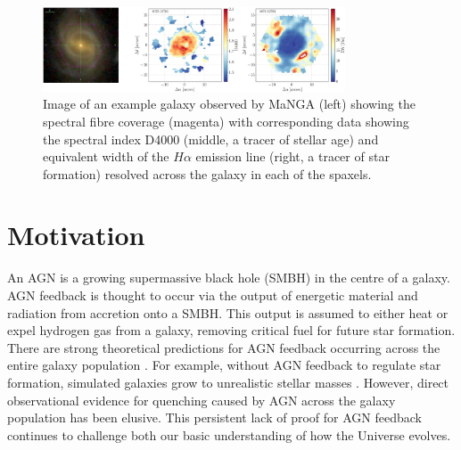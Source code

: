 \documentclass[11pt]{article}
\begin{document}
\begin{figure}[h]
\begin{centering}
\includegraphics[width=0.8\textwidth]{image_halpha_vel_map_8078-12703_gal_aligned_ifu_bundles-MAPS-VOR10-GAU-MILESHC.pdf}
\vspace{-0.5em}
\caption[8pt]{Image of an example galaxy observed by MaNGA (left) showing the spectral fibre coverage (magenta) with corresponding data showing the spectral index D4000 (middle, a tracer of stellar age) and equivalent width of the $H\alpha$ emission line (right, a tracer of star formation) resolved across the galaxy in each of the spaxels.}
\label{gal}
\end{centering}
\vspace{-1.5em}
\end{figure}
\vspace{-0.5em}

\section*{\large Motivation}
\vspace{-0.5em}

\indent An AGN is a growing supermassive black hole (SMBH) in the centre of a galaxy. %
AGN feedback is thought to occur via the output of energetic material and radiation from accretion onto a SMBH. This output is  assumed to either heat or expel hydrogen gas from a galaxy, removing critical fuel for future star formation. There are strong theoretical predictions for AGN feedback occurring across the entire galaxy population \citep{Fabian12, Gaibler12}. For example, without AGN feedback to regulate star formation, simulated galaxies grow to unrealistic stellar masses \citep[e.g.][]{silk12}. However, direct observational evidence for quenching caused by AGN across the galaxy population has been elusive. This persistent lack of proof for AGN feedback continues to challenge both our basic understanding of how the Universe evolves. 
\end{document}
